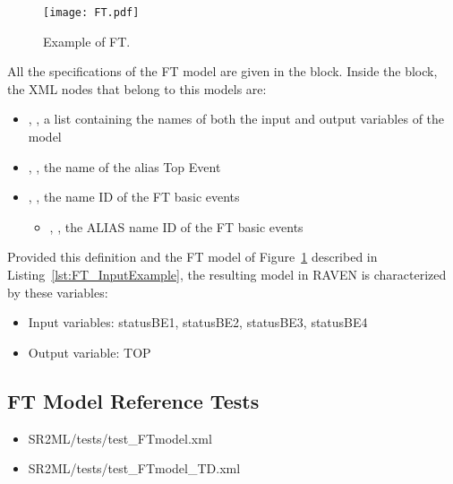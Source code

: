 \begin{figure}
    \centering
    \centerline{\texttt{[image: FT.pdf]}}
    \caption{Example of FT.}
    \label{fig:FT}
\end{figure}

All the specifications of the FT model are given in the
 block.
Inside the  block, the XML
nodes that belong to this models are:
\begin{itemize}
  \item  {}, , a list containing the names of both the input and output variables of the model
  \item  {}, , the name of the alias Top Event
  \item  {}, , the name ID of the FT basic events
	  \begin{itemize}
	    \item {}, , the ALIAS name ID of the FT basic events
	  \end{itemize}
\end{itemize}

Provided this definition and the FT model of Figure~\ref{fig:FT} described in Listing~\ref{lst:FT_InputExample},
the resulting model in RAVEN is characterized by these variables:
\begin{itemize}
	\item Input variables: statusBE1, statusBE2, statusBE3, statusBE4
	\item Output variable: TOP
\end{itemize}

\subsection{FT Model Reference Tests}
\begin{itemize}
	\item SR2ML/tests/test\_FTmodel.xml
	\item SR2ML/tests/test\_FTmodel\_TD.xml
\end{itemize}
